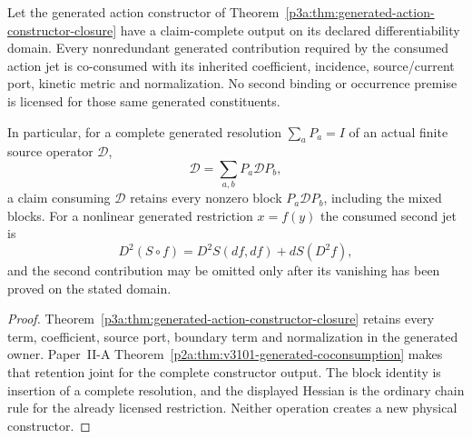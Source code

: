 \documentclass[12pt,a4paper]{article}
\begin{document}
\begin{corollary}
\label{p3a:cor:v183-action-coconsumption}
Let the generated action constructor of
Theorem~\ref{p3a:thm:generated-action-constructor-closure} have a
claim-complete output on its declared differentiability domain.  Every
nonredundant generated contribution required by the consumed action jet is
co-consumed with its inherited coefficient, incidence, source/current port,
kinetic metric and normalization.  No second binding or occurrence premise is
licensed for those same generated constituents.

In particular, for a complete generated resolution $\sum_aP_a=I$ of an actual
finite source operator $\mathcal D$,
\[
 \mathcal D=\sum_{a,b}P_a\mathcal D P_b,
\]
a claim consuming $\mathcal D$ retains every nonzero block
$P_a\mathcal D P_b$, including the mixed blocks.  For a nonlinear generated
restriction $x=f(y)$ the consumed second jet is
\[
 D^2(S\circ f)=D^2S(df,df)+dS(D^2f),
\]
and the second contribution may be omitted only after its vanishing has been
proved on the stated domain.
\end{corollary}

\begin{proof}
Theorem~\ref{p3a:thm:generated-action-constructor-closure} retains every term,
coefficient, source port, boundary term and normalization in the generated
owner.  Paper~II-A Theorem~\ref{p2a:thm:v3101-generated-coconsumption} makes
that retention joint for the complete constructor output.  The block identity
is insertion of a complete resolution, and the displayed Hessian is the
ordinary chain rule for the already licensed restriction.  Neither operation
creates a new physical constructor.
\end{proof}
\end{document}
